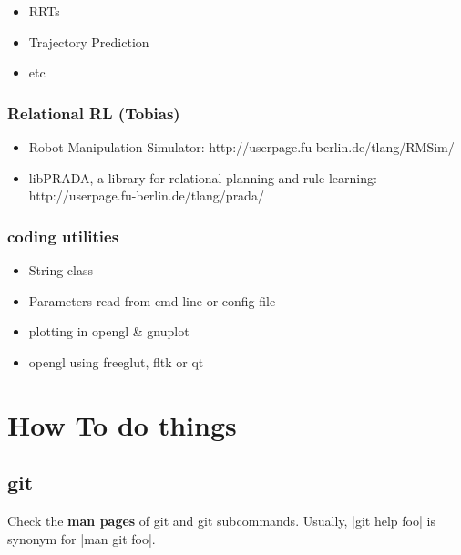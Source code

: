 \begin{itemize}
\item RRTs

\item Trajectory Prediction

\item etc
\end{itemize}



\subsubsection{Relational RL (Tobias)}

\begin{itemize}
\item Robot Manipulation Simulator: http://userpage.fu-berlin.de/tlang/RMSim/

\item libPRADA, a library for relational planning and rule learning: http://userpage.fu-berlin.de/tlang/prada/
\end{itemize}


\subsubsection{coding utilities}

\begin{itemize}
\item String class

\item Parameters read from cmd line or config file

\item plotting in opengl \& gnuplot

\item opengl using freeglut, fltk or qt
\end{itemize}









\section{How To do things}


\subsection{git}\label{secGit}

Check the \textbf{man pages} of git and git subcommands. Usually,
|git help foo| is synonym for |man git foo|.

